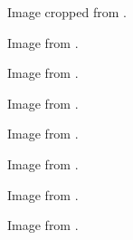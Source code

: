 	\begin{minipage}{\textwidth}
		Image cropped from \cite{egg}.
	\end{minipage}

	\begin{minipage}{\textwidth}
		Image from \cite{fruit}.
	\end{minipage}

	\begin{minipage}{\textwidth}
		Image from \cite{chickenFoot}.
	\end{minipage}

	\begin{minipage}{\textwidth}
		Image from \cite{rice}.
	\end{minipage}

	\begin{minipage}{\textwidth}
		Image from \cite{potato}.
	\end{minipage}

	\begin{minipage}{\textwidth}
		Image from \cite{soup}.
	\end{minipage}

	\begin{minipage}{\textwidth}
		Image from \cite{pasta}.
	\end{minipage}

	\begin{minipage}{\textwidth}
		Image from \cite{grass}.
	\end{minipage}
